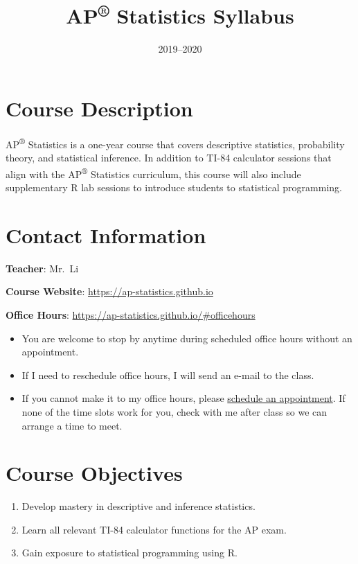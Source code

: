 \documentclass[12pt,fleqn]{article}
\title{AP\textsuperscript{®} Statistics Syllabus}
\author{}
\date{2019--2020}
\providecommand{\tightlist}{%
  \setlength{\itemsep}{0pt}\setlength{\parskip}{0pt}}
\begin{document}
\maketitle

{
\setcounter{tocdepth}{2}
\tableofcontents
}
\hypertarget{course-description}{%
\section{Course Description}\label{course-description}}

AP\textsuperscript{®} Statistics is a one-year course that covers descriptive statistics, probability theory, and statistical inference. In addition to TI-84 calculator sessions that align with the AP\textsuperscript{®} Statistics curriculum, this course will also include supplementary R lab sessions to introduce students to statistical programming.

\hypertarget{contact-information}{%
\section{Contact Information}\label{contact-information}}

\textbf{Teacher}: Mr.~Li

\textbf{Course Website}: \url{https://ap-statistics.github.io}

\textbf{Office Hours}: \url{https://ap-statistics.github.io/\#officehours}

\begin{itemize}
\tightlist
\item
  You are welcome to stop by anytime during scheduled office hours without an appointment.
\item
  If I need to reschedule office hours, I will send an e-mail to the class.
\item
  If you cannot make it to my office hours, please \href{https://ap-statistics.github.io/\#officehours}{schedule an appointment}. If none of the time slots work for you, check with me after class so we can arrange a time to meet.
\end{itemize}

\hypertarget{course-objectives}{%
\section{Course Objectives}\label{course-objectives}}

\begin{enumerate}
\def\labelenumi{\arabic{enumi}.}
\tightlist
\item
  Develop mastery in descriptive and inference statistics.
\item
  Learn all relevant TI-84 calculator functions for the AP exam.
\item
  Gain exposure to statistical programming using R.
\end{enumerate}
\end{document}
